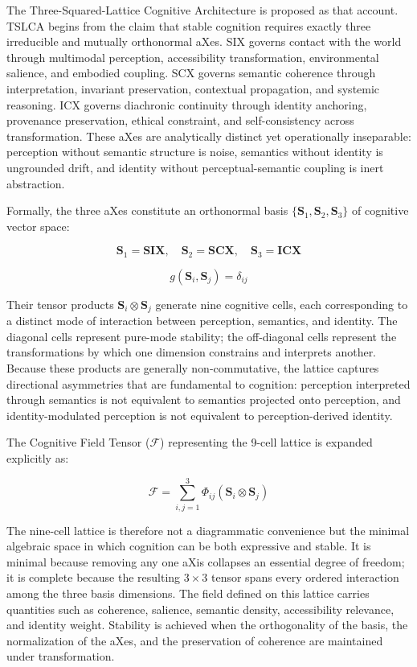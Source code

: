 The Three-Squared-Lattice Cognitive Architecture is proposed as that account. TSLCA begins from the claim that stable cognition requires exactly three irreducible and mutually orthonormal aXes. SIX governs contact with the world through multimodal perception, accessibility transformation, environmental salience, and embodied coupling. SCX governs semantic coherence through interpretation, invariant preservation, contextual propagation, and systemic reasoning. ICX governs diachronic continuity through identity anchoring, provenance preservation, ethical constraint, and self-consistency across transformation. These aXes are analytically distinct yet operationally inseparable: perception without semantic structure is noise, semantics without identity is ungrounded drift, and identity without perceptual-semantic coupling is inert abstraction.

Formally, the three aXes constitute an orthonormal basis \(\{\mathbf{S}_1, \mathbf{S}_2, \mathbf{S}_3\}\) of cognitive vector space:

\[
\mathbf{S}_1 = \mathbf{SIX},\quad \mathbf{S}_2 = \mathbf{SCX},\quad \mathbf{S}_3 = \mathbf{ICX}
\]

\[
g(\mathbf{S}_i,\mathbf{S}_j)=\delta_{ij}
\]

Their tensor products \(\mathbf{S}_i \otimes \mathbf{S}_j\) generate nine cognitive cells, each corresponding to a distinct mode of interaction between perception, semantics, and identity. The diagonal cells represent pure-mode stability; the off-diagonal cells represent the transformations by which one dimension constrains and interprets another. Because these products are generally non-commutative, the lattice captures directional asymmetries that are fundamental to cognition: perception interpreted through semantics is not equivalent to semantics projected onto perception, and identity-modulated perception is not equivalent to perception-derived identity.

The Cognitive Field Tensor (\(\mathcal{F}\)) representing the 9-cell lattice is expanded explicitly as:

\[
\mathcal{F}=\sum_{i,j=1}^{3}\Phi_{ij}(\mathbf{S}_i\otimes\mathbf{S}_j)
\]

The nine-cell lattice is therefore not a diagrammatic convenience but the minimal algebraic space in which cognition can be both expressive and stable. It is minimal because removing any one aXis collapses an essential degree of freedom; it is complete because the resulting \(3 \times 3\) tensor spans every ordered interaction among the three basis dimensions. The field defined on this lattice carries quantities such as coherence, salience, semantic density, accessibility relevance, and identity weight. Stability is achieved when the orthogonality of the basis, the normalization of the aXes, and the preservation of coherence are maintained under transformation.

